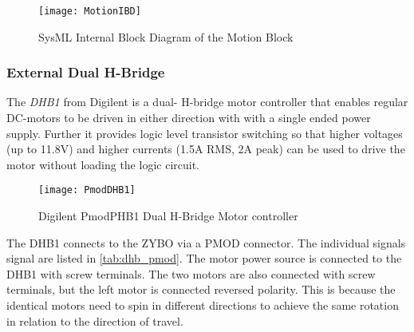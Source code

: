 \documentclass[Main]{subfiles}
\begin{document}
		\begin{figure}[H]
			\centering
			\texttt{[image: MotionIBD]}
			\caption{SysML Internal Block Diagram of the Motion Block}
			\label{fig:motion_ibd}
		\end{figure}

		\subsubsection{External Dual H-Bridge} %
		\label{ssub:external_dual_h_bridge}
			
			The \emph{DHB1} from Digilent is a dual- H-bridge motor controller that enables regular DC-motors to be driven in either direction with with a single ended power supply.
			Further it provides logic level transistor switching so that higher voltages (up to 11.8V) and higher currents (1.5A RMS, 2A peak) can be used to drive the motor without loading the logic circuit.

			\begin{figure}[H]
				\centering
				\texttt{[image: PmodDHB1]}
				\caption{Digilent PmodPHB1 Dual H-Bridge Motor controller \cite{Digilent2013}}
				\label{fig:DHB1}
			\end{figure}

			The DHB1 connects to the ZYBO via a PMOD connector. The individual signals signal are listed in \autoref{tab:dhb_pmod}.
			The motor power source is connected to the DHB1 with screw terminals. The two motors are also connected with screw terminals, but the left motor is connected reversed polarity.
			This is because the identical motors need to spin in different directions to achieve the same rotation in relation to the direction of travel.
\end{document}
